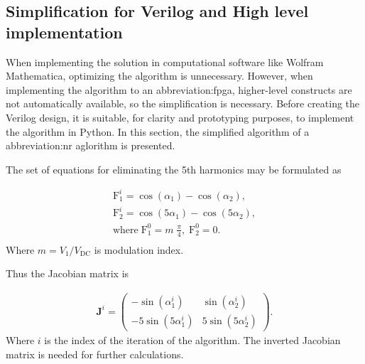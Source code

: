 \documentclass[a4paper, twoside, 11pt]{article}
\begin{document}
    \subsection{Simplification for Verilog and High level implementation}\label{subsec:simplification-for-verilog-and-high-level-implementation}
        When implementing the solution in computational software like Wolfram Mathematica, optimizing the algorithm is unnecessary. However, when implementing the algorithm to an \gls{abbreviation:fpga}, higher-level constructs are not automatically available, so the simplification is necessary. Before creating the Verilog design, it is suitable, for clarity and prototyping purposes, to implement the algorithm in Python. In this section, the simplified algorithm of a \gls{abbreviation:nr} aglorithm is presented.\par

        The set of equations for eliminating the 5th harmonics may be formulated as

        \begin{equation}
            \begin{gathered}
                \mathrm{F}_1^i = \cos(\alpha_1) - \cos(\alpha_2),\\
                \mathrm{F}_2^i = \cos(5\alpha_1) - \cos(5\alpha_2),\\
                \mathrm{where} \; \mathrm{F}_1^0 = m \; \frac{\pi}{4},\; \mathrm{F}_2^0 = 0.\\
            \end{gathered}
        \end{equation}
        Where $m = V_1/V_{\mathrm{DC}}$ is modulation index.\par
        Thus the Jacobian matrix is

        \begin{equation}
            \begin{gathered}
                \textbf{J}^i = 
                \begin{pmatrix}
                    - \sin(\alpha_1^i) & \sin(\alpha_2^i)\\
                    - 5 \sin(5\alpha_1^i) & 5 \sin(5\alpha_2^i)
                \end{pmatrix}.
            \end{gathered}
        \end{equation}
        Where $i$ is the index of the iteration of the algorithm. The inverted Jacobian matrix is needed for further calculations.
\end{document}
